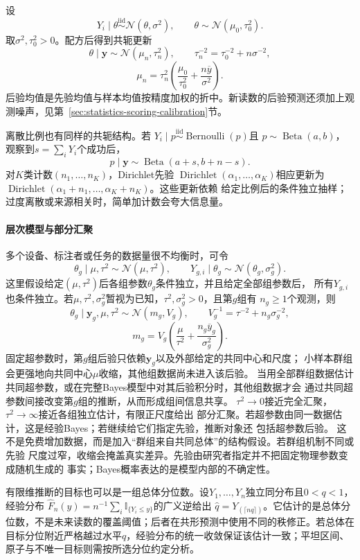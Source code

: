 设
\[
  Y_i\mid\theta\overset{\mathrm{iid}}{\sim}\mathcal N(\theta,\sigma^2),
  \qquad
  \theta\sim\mathcal N(\mu_0,\tau_0^2).
\]
取\(\sigma^2,\tau_0^2>0\)。配方后得到共轭更新
\[
  \theta\mid\bm y
  \sim\mathcal N(\mu_n,\tau_n^2),\qquad
  \tau_n^{-2}=\tau_0^{-2}+n\sigma^{-2},
\]
\[
  \mu_n=\tau_n^2
  \left(\frac{\mu_0}{\tau_0^2}+\frac{n\overline y}{\sigma^2}\right).
\]
后验均值是先验均值与样本均值按精度加权的折中。新读数的后验预测还须加上观测噪声，见第~\ref{sec:statistics-scoring-calibration}节。

离散比例也有同样的共轭结构。若
\(Y_i\mid p\overset{\mathrm{iid}}{\sim}\operatorname{Bernoulli}(p)\)且
\(p\sim\operatorname{Beta}(a,b)\)，观察到\(s=\sum_iY_i\)个成功后，
\[
  p\mid\bm y\sim\operatorname{Beta}(a+s,b+n-s).
\]
对\(K\)类计数\((n_1,\ldots,n_K)\)，Dirichlet先验
\(\operatorname{Dirichlet}(\alpha_1,\ldots,\alpha_K)\)相应更新为
\(\operatorname{Dirichlet}(\alpha_1+n_1,\ldots,\alpha_K+n_K)\)。这些更新依赖
给定比例后的条件独立抽样；过度离散或来源相关时，简单加计数会夸大信息量。

\paragraph{层次模型与部分汇聚}
多个设备、标注者或任务的数据量很不均衡时，可令
\[
  \theta_g\mid\mu,\tau^2\sim\mathcal N(\mu,\tau^2),\qquad
  Y_{g,i}\mid\theta_g\sim\mathcal N(\theta_g,\sigma_g^2).
\]
这里假设给定\((\mu,\tau^2)\)后各组参数\(\theta_g\)条件独立，并且给定全部组参数后，
所有\(Y_{g,i}\)也条件独立。若\(\mu,\tau^2,\sigma_g^2\)暂视为已知，\(\tau^2,\sigma_g^2>0\)，且第\(g\)组有
\(n_g\geq1\)个观测，则
\[
  \theta_g\mid\bm y_g,\mu,\tau^2
  \sim\mathcal N(m_g,V_g),\qquad
  V_g^{-1}=\tau^{-2}+n_g\sigma_g^{-2},
\]
\[
  m_g
  =V_g\left(\frac{\mu}{\tau^2}
    +\frac{n_g\overline y_g}{\sigma_g^2}\right).
\]
固定超参数时，第\(g\)组后验只依赖\(\bm y_g\)以及外部给定的共同中心和尺度；
小样本群组会更强地向共同中心\(\mu\)收缩，其他组数据尚未进入该后验。
当用全部群组数据估计共同超参数，或在完整Bayes模型中对其后验积分时，其他组数据才会
通过共同超参数间接改变第\(g\)组的推断，从而形成组间信息共享。
\(\tau^2\to0\)接近完全汇聚，\(\tau^2\to\infty\)接近各组独立估计，有限正尺度给出
部分汇聚。若超参数由同一数据估计，这是经验Bayes；若继续给它们指定先验，推断对象还
包括超参数后验。
这不是免费增加数据，而是加入“群组来自共同总体”的结构假设。若群组机制不同或先验
尺度过窄，收缩会掩盖真实差异。先验由研究者指定并不把固定物理参数变成随机生成的
事实；Bayes概率表达的是模型内部的不确定性。

有限维推断的目标也可以是一组总体分位数。设\(Y_1,\ldots,Y_n\)独立同分布且\(0<q<1\)，经验分布
\(\widehat F_n(y)=n^{-1}\sum_i\mathbb I_{\{Y_i\leq y\}}\)的广义逆给出
\(\widehat q=Y_{(\lceil nq\rceil)}\)。它估计的是总体分位数，不是未来读数的覆盖阈值；后者在共形预测中使用不同的秩修正。若总体在目标分位附近严格越过水平\(q\)，经验分布的统一收敛保证该估计一致；平坦区间、原子与不唯一目标则需按所选分位约定分析。

